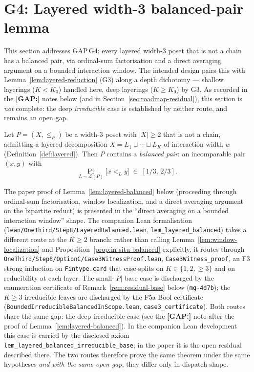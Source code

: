 \section{G4: Layered width-3 balanced-pair lemma}
\label{sec:g4-balanced-pair}

This section addresses GAP\,G4: every layered width-$3$ poset that is
not a chain has a balanced pair, via ordinal-sum factorisation and a
direct averaging argument on a bounded interaction window. The
intended design pairs this with Lemma~\ref{lem:layered-reduction} (G3)
along a depth dichotomy --- shallow layerings ($K < K_0$) handled
here, deep layerings ($K \ge K_0$) by G3. As recorded in the
\textbf{[GAP:]} notes below (and in Section~\ref{sec:roadmap-residual}),
this section is \emph{not} complete: the deep \emph{irreducible} case
is established by neither route, and remains an open gap.

\begin{lemma}
\label{lem:layered-balanced}
Let $P = (X, \le_P)$ be a width-$3$ poset with $|X| \ge 2$ that is not
a chain, admitting a layered decomposition
$X = L_1 \sqcup \cdots \sqcup L_K$ of interaction width $w$
(Definition~\ref{def:layered}). Then $P$ contains a \emph{balanced
pair}: an incomparable pair $(x, y)$ with
\[
  \Pr_{L \sim \mathcal L(P)}\!\big[x <_L y\big]
  \;\in\; [1/3,\, 2/3].
\]
\end{lemma}

\begin{remark}\label{rem:layered-balanced-lean}
The paper proof of Lemma~\ref{lem:layered-balanced} below (proceeding
through ordinal-sum factorisation, window localization, and a direct
averaging argument on the bipartite reduct) is presented in the
``direct averaging on a bounded interaction window'' shape. The
companion Lean formalisation
(\texttt{lean/OneThird/Step8/LayeredBalanced.lean},
\texttt{lem\_layered\_balanced}) takes a different route at the
$K \ge 2$ branch: rather than calling
Lemma~\ref{lem:window-localization} and
Proposition~\ref{prop:in-situ-balanced} explicitly, it routes through
\texttt{OneThird/Step8/OptionC/Case3WitnessProof.lean},
\texttt{Case3Witness\_proof}, an F3 strong induction on
\texttt{Fintype.card} that case-splits on $K \in \{1, 2, \ge 3\}$ and on
reducibility at each layer. The small-$|P|$ base case is discharged
by the enumeration certificate of Remark~\ref{rem:residual-base}
below (\texttt{mg-4d7b}); the $K \ge 3$ irreducible leaves are
discharged by the F5a Bool certificate
(\texttt{BoundedIrreducibleBalancedInScope.lean},
\texttt{case3\_certificate}). Both routes share the same gap: the deep
irreducible case (see the \textbf{[GAP:]} note after the proof of
Lemma~\ref{lem:layered-balanced}). In the companion Lean development
this case is carried by the disclosed axiom
\texttt{lem\_layered\_balanced\_irreducible\_base}; in the paper it is
the open residual described there. The two routes therefore prove the
same theorem under the same hypotheses \emph{and with the same open
gap}; they differ only in dispatch shape.
\end{remark}

